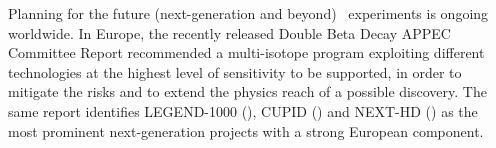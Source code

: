 Planning for the future (next-generation and beyond) \bbonu\ experiments is ongoing worldwide. In Europe, the recently released Double Beta Decay APPEC Committee
Report \cite{Giuliani:2019uno} recommended a multi-isotope program exploiting different technologies at the highest level of sensitivity to be supported, in order to mitigate the risks and to extend the physics reach of a possible discovery. The same report identifies LEGEND-1000 (), CUPID () and NEXT-HD () as the most prominent next-generation projects with a strong European component. 
